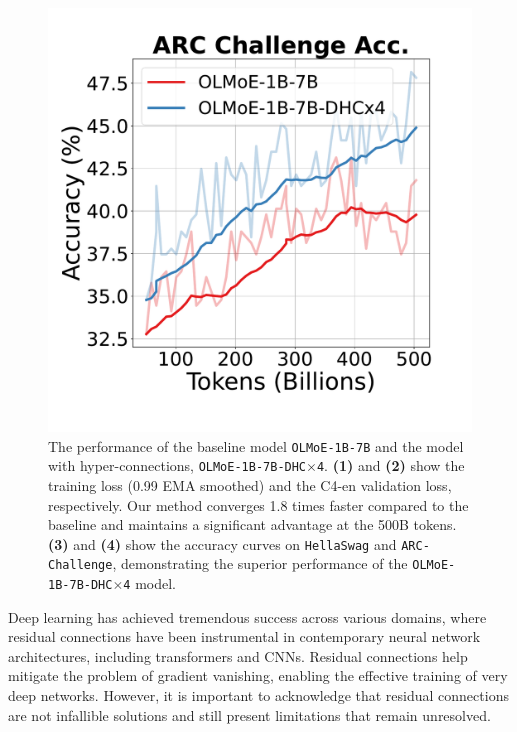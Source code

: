 \documentclass{article} %
\begin{document}
\begin{figure}[h]
\begin{minipage}{0.25\textwidth}
     \end{minipage}\hfill
    \begin{minipage}{0.25\textwidth}
        \centering
        \includegraphics[width=\linewidth]{fig/OLMoE_1B7B_ARC_Challenge_Acc.pdf}
    \end{minipage}
    \caption{The performance of the baseline model \texttt{OLMoE-1B-7B} and the model with hyper-connections, \texttt{OLMoE-1B-7B-DHC$\times$4}. \textbf{(1)} and \textbf{(2)} show the training loss (0.99 EMA smoothed) and the C4-en validation loss, respectively. Our method converges 1.8 times faster compared to the baseline and maintains a significant advantage at the 500B tokens. \textbf{(3)} and \textbf{(4)} show the accuracy curves on \texttt{HellaSwag} and \texttt{ARC-Challenge}, demonstrating the superior performance of the \texttt{OLMoE-1B-7B-DHC$\times$4} model.}
    \label{fig:olmoe_curves}
\end{figure}
Deep learning has achieved tremendous success across various domains, where residual connections \citep{he2016deep} have been instrumental in contemporary neural network architectures, including transformers and CNNs. Residual connections help mitigate the problem of gradient vanishing, enabling the effective training of very deep networks. However, it is important to acknowledge that residual connections are not infallible solutions and still present limitations that remain unresolved.
\end{document}
